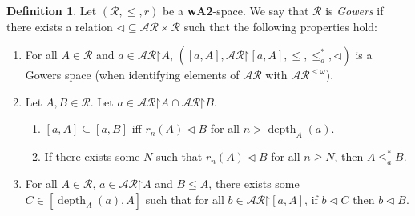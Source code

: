 \documentclass[11pt,reqno]{amsart}
\theoremstyle{plain}
\numberwithin{equation}{section}
\theoremstyle{definition}
\newtheorem{definition}[theorem]{Definition}
\newcommand{\func}{\operatorname}
\newcommand{\cal}{\mathcal}
\newcommand{\restrictedto}{\mathord{\upharpoonright}}
\newcommand{\depth}{\func{depth}}
\begin{document}
\begin{definition}
    Let $(\cal{R},\leq,r)$ be a \textbf{wA2}-space. We say that $\cal{R}$ is \emph{Gowers} if there exists a relation $\lhd \subseteq \cal{AR} \times \cal{R}$ such that  the following properties hold:
    \begin{enumerate}
        \item[(\textbf{G1}-\textbf{5})] For all $A \in \cal{R}$ and $a \in \cal{AR}\restrictedto A$, $([a,A],\cal{AR}\restrictedto[a,A],\leq,\leq_a^*,\lhd)$ is a Gowers space (when identifying elements of $\cal{AR}$ with $\cal{AR}^{<\omega}$).

        \item[(\textbf{G6})] Let $A,B \in \cal{R}$. Let $a \in \cal{AR}\restrictedto A \cap \cal{AR}\restrictedto B$.
        \begin{enumerate}[label=(\arabic*)]
            \item $[a,A] \subseteq [a,B]$ iff $r_n(A) \lhd B$ for all $n > \depth_A(a)$.

            \item If there exists some $N$ such that $r_n(A) \lhd B$ for all $n \geq N$, then $A \leq_a^* B$.
        \end{enumerate}

        \item[(\textbf{G7})] For all $A \in \cal{R}$, $a \in \cal{AR}\restrictedto A$ and $B \leq A$, there exists some $C \in [\depth_A(a),A]$ such that for all $b \in \cal{AR}\restrictedto[a,A]$, if $b \lhd C$ then $b \lhd B$.
    \end{enumerate}
\end{definition}
\end{document}
